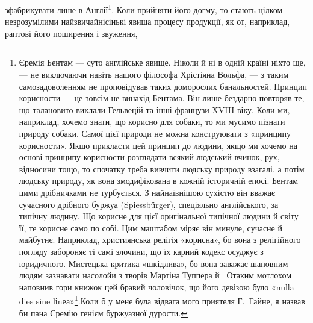 зфабрикувати лише в Англії\footnote{
Єремія Бентам — суто англійське явище. Ніколи й ні в одній
країні ніхто ще, — не виключаючи навіть нашого філософа Хрістіяна
Вольфа, — з таким самозадоволенням не проповідував таких доморослих
банальностей. Принцип корисности — це зовсім не винахід Бентама.
Він лише бездарно повторяв те, що талановито виклали Гельвецій та
інші французи XVIII віку. Коли ми, наприклад, хочемо знати, що корисно
для собаки, то ми мусимо пізнати природу собаки. Самої цієї природи
не можна конструювати з «принципу корисности». Якщо прикласти
цей принцип до людини, якщо ми хочемо на основі принципу корисности
розглядати всякий людський вчинок, рух, відносини тощо,
то спочатку треба вивчити людську природу взагалі, а потім людську
природу, як вона змодифікована в кожній історичній епосі. Бентам цими
дрібничками не турбується. З найнаївнішою сухістю він вважає сучасного
дрібного буржуа (Spiessbürger), спеціяльно англійського, за типічну
людину. Що корисне для цієї оригінальної типічної людини й світу її,
те корисне само по собі. Цим маштабом міряє він минуле, сучасне й майбутнє.
Наприклад, християнська релігія «корисна», бо вона з релігійного
погляду забороняє ті самі злочини, що їх карний кодекс осуджує з
юридичного. Мистецька критика «шкідлива», бо вона заважає шановним
людям зазнавати насолойи з творів Мартіна Туппера й~ Отаким мотлохом
наповнив гори книжок цей бравий чоловічок, що його девізою було
«nulla dies sine lіnеа»\footnote*{
— жодного дня без рядка. \emph{Ред.}
}.Коли б у мене була відвага мого приятеля Г.~Гайне,
я назвав би пана Єремію генієм буржуазної дурости.
}. Коли прийняти його догму, то
стають цілком незрозумілими найзвичайнісінькі явища процесу
продукції, як от, наприклад, раптові його поширення і звуження,
\parbreak{}  %
